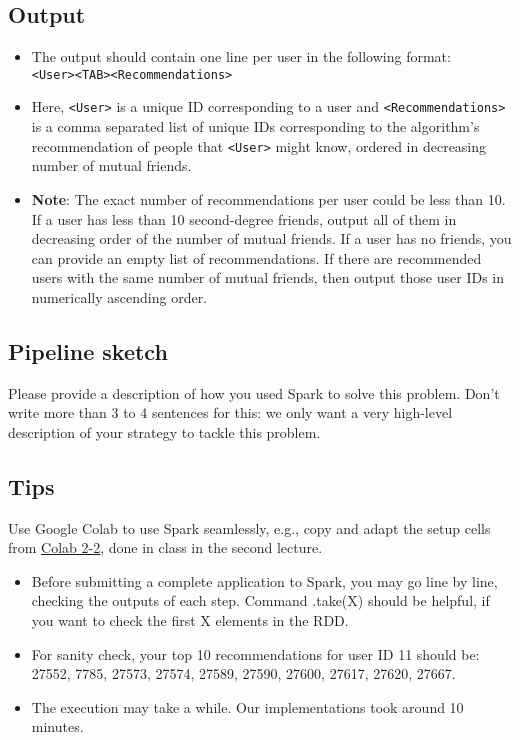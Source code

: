 \documentclass[paper=a4, fontsize=11pt]{scrartcl} %
\begin{document}
\subsection{Output}
\begin{itemize}
    \item The output should contain one line per user in the following format: \\ \verb"<User><TAB><Recommendations>"
    \item Here, \verb"<User>" is a unique ID corresponding to a user and \verb"<Recommendations>" is a comma separated list of unique IDs corresponding to the algorithm’s recommendation of people that \verb"<User>" might know, ordered in decreasing number of mutual friends. 
    \item \textbf{Note}: The exact number of recommendations per user could be less than 10. If a user has less than 10 second-degree friends, output all of them in decreasing order of the number of mutual friends. If a user has no friends, you can provide an empty list of recommendations. If there are recommended users with the same number of mutual friends, then output those user IDs in numerically ascending order.
\end{itemize}

\subsection{Pipeline sketch}
Please provide a description of how you used Spark to solve this problem. Don’t write more than 3 to 4 sentences for this: we only want a very high-level description of your strategy to tackle this problem. 

\subsection{Tips}
 Use Google Colab to use Spark seamlessly, e.g., copy and adapt the setup cells from \href{https://colab.research.google.com/drive/1ewNJb9KJBaMwTlsEggirmpmVbO8V7C-q?usp=sharing}{Colab 2-2}, done in class in the second lecture. 
 
\begin{itemize}
    \item Before submitting a complete application to Spark, you may go line by line, checking the outputs of each step. Command .take(X) should be helpful, if you want to check the first X elements in the RDD. 
    \item For sanity check, your top 10 recommendations for user ID 11 should be: \\ 27552, 7785, 27573, 27574, 27589, 27590, 27600, 27617, 27620, 27667. 
    \item The execution may take a while. Our implementations took around 10 minutes. 
\end{itemize}
\end{document}
